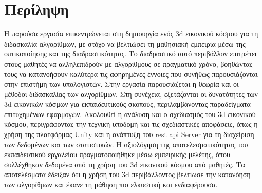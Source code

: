 {}
\section*{Περίληψη}

Η παρούσα εργασία επικεντρώνεται στη δημιουργία ενός \acrshort{3d} εικονικού κόσμου για τη διδασκαλία αλγορίθμων, με στόχο να βελτιώσει τη μαθησιακή εμπειρία μέσω της οπτικοποίησης και της διαδραστικότητας. Το διαδραστικό αυτό περιβάλλον επιτρέπει στους μαθητές να αλληλεπιδρούν με αλγορίθμους σε πραγματικό χρόνο, βοηθώντας τους να κατανοήσουν καλύτερα τις αφηρημένες έννοιες που συνήθως παρουσιάζονται στην επιστήμη των υπολογιστών. Στην εργασία παρουσιάζεται η θεωρία και οι μέθοδοι διδασκαλίας των αλγορίθμων. Στη συνέχεια, εξετάζονται οι δυνατότητες των \acrshort{3d} εικονικών κόσμων για εκπαιδευτικούς σκοπούς, περιλαμβάνοντας παραδείγματα επιτυχημένων εφαρμογών. Ακολουθεί η ανάλυση και ο σχεδιασμός του \acrshort{3d} εικονικού κόσμου, περιγράφοντας την τεχνική υποδομή και τις σχεδιαστικές αποφάσεις, όπως η χρήση της πλατφόρμας Unity και η ανάπτυξη του \acrshort{rest} \acrshort{api} Server για τη διαχείριση των δεδομένων και των στατιστικών. Η αξιολόγηση της αποτελεσματικότητας του εκπαιδευτικού εργαλείου πραγματοποιήθηκε μέσω εμπειρικής μελέτης, όπου συλλέχθηκαν δεδομένα από τη χρήση του \acrshort{3d} εικονικού κόσμου από μαθητές. Τα αποτελέσματα έδειξαν ότι η χρήση του \acrshort{3d} περιβάλλοντος βελτίωσε την κατανόηση των αλγορίθμων και έκανε τη μάθηση πιο ελκυστική και ενδιαφέρουσα.

\pagebreak
